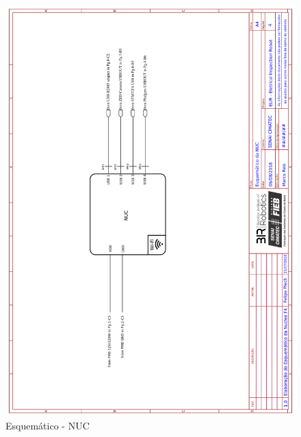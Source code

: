    
    \begin{figure}[h]
	\centering
	\includegraphics[width=14cm]{Figures/EsquematicoNUC.png}
	\caption{Esquemático - NUC} \label{NUC}
	\end{figure}
	
    \pagebreak

